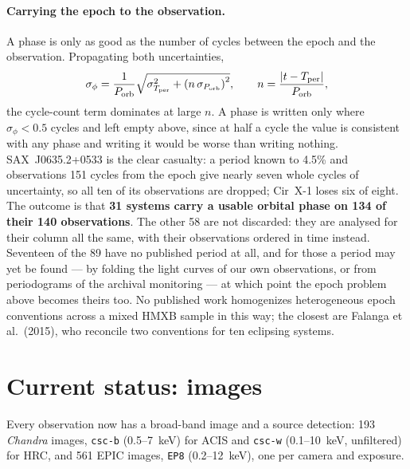 \documentclass[10pt,a4paper]{article}
\begin{document}
\paragraph{Carrying the epoch to the observation.} A phase is only as good as
the number of cycles between the epoch and the observation. Propagating both
uncertainties,
\begin{equation}
\sigma_{\phi}=\frac{1}{P_{\rm orb}}\sqrt{\sigma_{T_{\rm per}}^{2}+\left(n\,\sigma_{P_{\rm orb}}\right)^{2}},
\qquad n=\frac{|t-T_{\rm per}|}{P_{\rm orb}},
\label{eq:sigphi}
\end{equation}
the cycle-count term dominates at large $n$. A phase is written only where
$\sigma_{\phi}<0.5$ cycles and left empty above, since at half a cycle the value
is consistent with any phase and writing it would be worse than writing
nothing. SAX~J0635.2+0533 is the clear casualty: a period known to 4.5\% and
observations 151 cycles from the epoch give nearly seven whole cycles of
uncertainty, so all ten of its observations are dropped; Cir~X-1 loses six of
eight. The outcome is that \textbf{31 systems carry a usable orbital phase
on 134 of their 140 observations}. The other 58 are not discarded: they are
analysed for their column all the same, with their observations ordered in time
instead. Seventeen of the 89 have no published period at all, and for
those a period may yet be found --- by folding the light curves of our own
observations, or from periodograms of the archival monitoring --- at which
point the epoch problem above becomes theirs too. No published work homogenizes
heterogeneous epoch conventions across a mixed HMXB sample in this way; the
closest are Falanga et al.\ (2015), who reconcile two conventions for ten
eclipsing systems.

\section{Current status: images}

Every observation now has a broad-band image and a source detection: 193
\textit{Chandra} images, \texttt{csc-b} (0.5--7~keV) for ACIS and \texttt{csc-w}
(0.1--10~keV, unfiltered) for HRC, and 561 EPIC images, \texttt{EP8}
(0.2--12~keV), one per camera and exposure.
\end{document}
